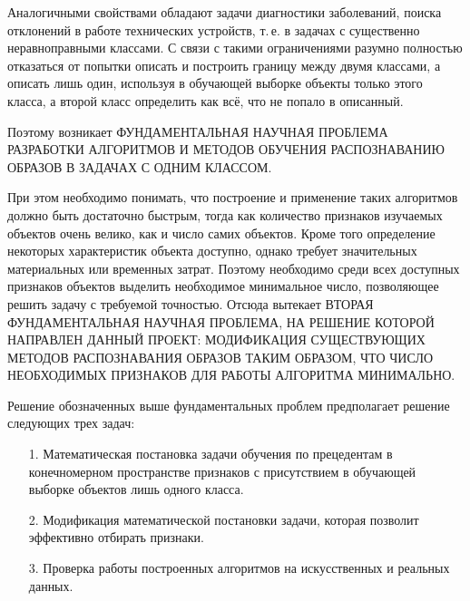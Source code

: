 \documentclass[12pt]{article}
\begin{document}
	Аналогичными свойствами обладают задачи диагностики заболеваний, поиска отклонений в работе технических устройств, т.\,е. в задачах с существенно неравноправными классами.
	С связи с такими ограничениями разумно полностью отказаться от попытки описать и построить границу между двумя классами, а описать лишь один, используя в обучающей выборке объекты только этого класса, а второй класс определить как всё, что не попало в описанный.

	Поэтому возникает \MakeTextUppercase{фундаментальная научная проблема разработки алгоритмов и методов обучения распознаванию образов в задачах с одним классом.}

	При этом необходимо понимать, что построение и применение таких алгоритмов должно быть достаточно быстрым, тогда как количество признаков изучаемых объектов очень велико, как и число самих объектов. 
	Кроме того определение некоторых характеристик объекта доступно, однако требует значительных материальных или временных затрат. 
	Поэтому необходимо среди всех доступных признаков объектов выделить необходимое минимальное число, позволяющее решить задачу с требуемой точностью. 
	Отсюда вытекает \MakeTextUppercase{вторая фундаментальная научная проблема, на решение которой направлен данный проект: модификация существующих методов распознавания образов таким образом, что число необходимых признаков для работы алгоритма минимально.}

	Решение обозначенных выше фундаментальных проблем предполагает решение следующих трех задач:
	\begin{enumerate}
		\item[1.] Математическая постановка задачи обучения по прецедентам в конечномерном пространстве признаков с присутствием в обучающей выборке объектов лишь одного класса.
		\item[2.] Модификация математической постановки задачи, которая позволит эффективно отбирать признаки.
		\item[3.] Проверка работы построенных алгоритмов на искусственных и реальных данных.
	\end{enumerate}
\end{document}
